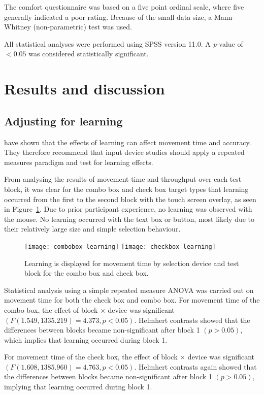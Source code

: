 \documentclass[a4paper]{article}
\begin{document}
The comfort questionnaire was based on a five point ordinal scale, where
five generally indicated a poor rating. Because of the small data size, a
Mann-Whitney (non-parametric) test was used.

All statistical analyses were performed using SPSS version 11.0. A
\emph{p}-value of \(< 0.05\) was considered statistically significant.


\section{Results and discussion}
\label{sec-results}


\subsection{Adjusting for learning}
\label{sec-results-learning}

\citet{Doug-SA-1999-CHI} have shown that the effects of learning can
affect movement time and accuracy. They therefore recommend that input
device studies should apply a repeated measures paradigm and test for
learning effects.

From analysing the results of movement time and throughput over each
test block, it was clear for the combo box and check box target types
that learning occurred from the first to the second block with the touch
screen overlay, as seen in Figure~\ref{fig-movement-time-learning}. Due
to prior participant experience, no learning was observed with the
mouse. No learning occurred with the text box or button, most likely due
to their relatively large size and simple selection behaviour.


\begin{figure}
	\centering
	\texttt{[image: combobox-learning]}
	\texttt{[image: checkbox-learning]}
	\caption{Learning is displayed for movement time by selection device
	and test block for the combo box and check box.}
	\label{fig-movement-time-learning}
\end{figure}


Statistical analysis using a simple repeated measure ANOVA was carried
out on movement time for both the check box and combo box. For movement
time of the combo box, the effect of block \(\times\) device was
significant \((F(1.549, 1335.219) = 4.373, p < 0.05)\). Helmhert
contrasts showed that the differences between blocks became
non-significant after block 1 \((p > 0.05)\), which implies that
learning occurred during block 1.

For movement time of the check box, the effect of block \(\times\)
device was significant \((F(1.608, 1385.960) = 4.763, p < 0.05)\).
Helmhert contrasts again showed that the differences between blocks
became non-significant after block 1 \((p > 0.05)\), implying that
learning occurred during block 1.
\end{document}
